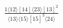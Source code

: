 \documentclass[varwidth, border=5pt]{standalone}
\begin{document}
\begin{my}
$\begin{gathered}
\scriptscriptstyle\frac{1⟨12⟩[14]⟨23⟩[13]^2}{⟨13⟩⟨15⟩[15]^3⟨24⟩}
\end{gathered}$
\end{my}
\end{document}
